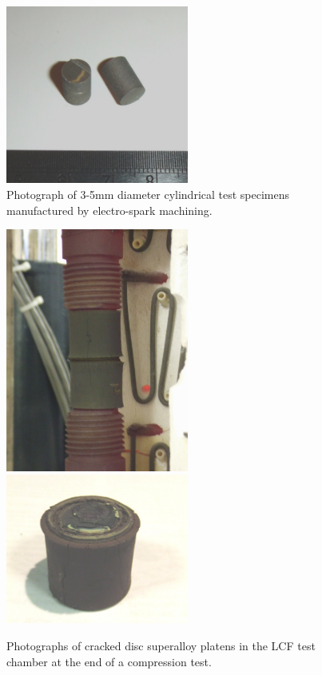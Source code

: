 %
%
\begin{figure}[H]
\begin{center}
\includegraphics[width=6cm]{testcylinders}
\caption{Photograph of 3-5mm diameter cylindrical test specimens manufactured by electro-spark machining.}
\label{fig:testcylinders}
\end{center}
\end{figure}
%
%
\begin{figure}[H]
\begin{center}
\includegraphics[width=6cm]{lcfhotzoom}
\includegraphics[width=6cm]{lcfhotzoomii}
\caption{Photographs of cracked disc superalloy platens in the LCF test chamber at the end of a compression test.}
\label{fig:lcfhotzoom}
\end{center}
\end{figure}
%

